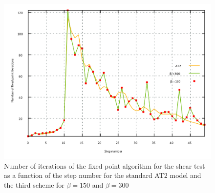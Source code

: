
\begin{figure}[H]
  \centering
  \includegraphics[width=10.cm]{../chapter_003_ef_micromorphic/figures/shear-iterations.pdf}
  \caption{Number of iterations of the fixed point algorithm for the shear test
  as a function of the step number for the standard AT2 model and the
  third scheme for \(\beta=150\) and
  \(\beta=300\)}
  \label{fig:micromorphic_damage:shear:iterations}
\end{figure}


